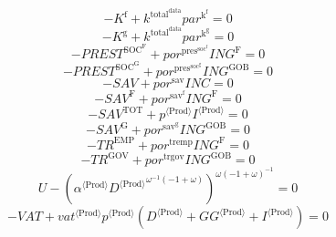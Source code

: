 \begin{equation}
-K^{\mathrm{f}} + {k^{\mathrm{total}^{\mathrm{data}}}} {{p\!a\!r}^{\mathrm{k}^{\mathrm{f}}}} = 0
\end{equation}
\begin{equation}
-K^{\mathrm{g}} + {k^{\mathrm{total}^{\mathrm{data}}}} {{p\!a\!r}^{\mathrm{k}^{\mathrm{g}}}} = 0
\end{equation}
\begin{equation}
-{P\!R\!E\!S\!T}^{\mathrm{SOC}^{\mathrm{F}}} + {{p\!o\!r}^{\mathrm{pres}^{\mathrm{soc}^{\mathrm{f}}}}} {{I\!N\!G}^{\mathrm{F}}} = 0
\end{equation}
\begin{equation}
-{P\!R\!E\!S\!T}^{\mathrm{SOC}^{\mathrm{G}}} + {{p\!o\!r}^{\mathrm{pres}^{\mathrm{soc}^{\mathrm{g}}}}} {{I\!N\!G}^{\mathrm{GOB}}} = 0
\end{equation}
\begin{equation}
-{S\!A\!V} + {{p\!o\!r}^{\mathrm{sav}}} {{I\!N\!C}} = 0
\end{equation}
\begin{equation}
-{S\!A\!V}^{\mathrm{F}} + {{p\!o\!r}^{\mathrm{sav}^{\mathrm{f}}}} {{I\!N\!G}^{\mathrm{F}}} = 0
\end{equation}
\begin{equation}
-{S\!A\!V}^{\mathrm{TOT}} + {{p}^{\langle \mathrm{Prod}\rangle}} {{I}^{\langle \mathrm{Prod}\rangle}} = 0
\end{equation}
\begin{equation}
-{S\!A\!V}^{\mathrm{G}} + {{p\!o\!r}^{\mathrm{sav}^{\mathrm{g}}}} {{I\!N\!G}^{\mathrm{GOB}}} = 0
\end{equation}
\begin{equation}
-{T\!R}^{\mathrm{EMP}} + {{p\!o\!r}^{\mathrm{tremp}}} {{I\!N\!G}^{\mathrm{F}}} = 0
\end{equation}
\begin{equation}
-{T\!R}^{\mathrm{GOV}} + {{p\!o\!r}^{\mathrm{trgov}}} {{I\!N\!G}^{\mathrm{GOB}}} = 0
\end{equation}
\begin{equation}
U - \left({{\alpha}^{\langle \mathrm{\mathrm{Prod}}\rangle}} {{{D}^{\langle \mathrm{Prod}\rangle}}^{{\omega}^{-1} \left(-1 + \omega\right)}}\right)^{{\omega} \left(-1 + \omega\right)^{-1}} = 0
\end{equation}
\begin{equation}
-{V\!A\!T} + {{{v\!a\!t}}^{\langle \mathrm{\mathrm{Prod}}\rangle}} {{p}^{\langle \mathrm{Prod}\rangle}} \left({D}^{\langle \mathrm{Prod}\rangle} + {{G\!G}}^{\langle \mathrm{Prod}\rangle} + {I}^{\langle \mathrm{Prod}\rangle}\right) = 0
\end{equation}
